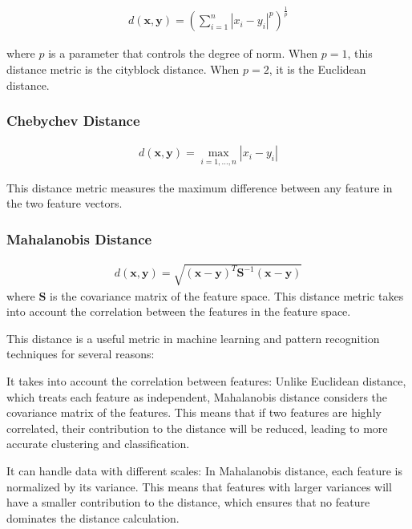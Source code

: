 \documentclass[12pt, a4paper]{article}
\begin{document}
\begin{align}
d(\boldsymbol{x},\boldsymbol{y}) = \left(\sum_{i=1}^n |x_i - y_i|^p\right)^{\frac{1}{p}}
\end{align}

where $p$ is a parameter that controls the degree of norm. When $p=1$, this distance metric is the cityblock distance. When $p=2$, it is the Euclidean distance.

\subsubsection{Chebychev Distance}

\begin{align}
d(\boldsymbol{x},\boldsymbol{y}) = \max_{i=1,\dots,n} |x_i - y_i|
\end{align}

This distance metric measures the maximum difference between any feature in the two feature vectors.

\subsubsection{Mahalanobis Distance}

\begin{align}
d(\boldsymbol{x},\boldsymbol{y}) = \sqrt{(\boldsymbol{x} - \boldsymbol{y})^T\boldsymbol{S}^{-1}(\boldsymbol{x} - \boldsymbol{y})}
\end{align}
where $\boldsymbol{S}$ is the covariance matrix of the feature space. This distance metric takes into account the correlation between the features in the feature space.

\vspace{1cm}

This distance is a useful metric in machine learning and pattern recognition techniques for several reasons:

It takes into account the correlation between features: Unlike Euclidean distance, which treats each feature as independent, Mahalanobis distance considers the covariance matrix of the features. This means that if two features are highly correlated, their contribution to the distance will be reduced, leading to more accurate clustering and classification.

It can handle data with different scales: In Mahalanobis distance, each feature is normalized by its variance. This means that features with larger variances will have a smaller contribution to the distance, which ensures that no feature dominates the distance calculation.
\end{document}

